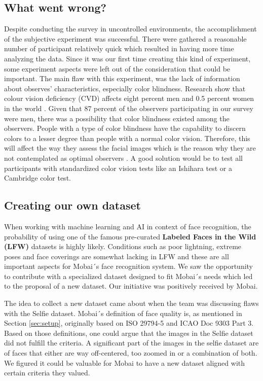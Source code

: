 \subsection{What went wrong?}
Despite conducting the survey in uncontrolled environments, the accomplishment of the subjective experiment was successful. There were gathered a reasonable number of participant relatively quick which resulted in having more time analyzing the data. Since it was our first time creating this kind of experiment, some experiment aspects were left out of the consideration that could be important. The main flaw with this experiment, was the lack of information about observes' characteristics, especially color blindness. Research show that colour vision deficiency (CVD) affects eight percent men and 0.5 percent women in the world \cite{colorblindness}. Given that 87 percent of the observers participating in our survey were men, there was a possibility that color blindness existed among the observers. People with a type of color blindness have the capability to discern colors to a lesser degree than people with a normal color vision. Therefore, this will affect the way they assess the facial images which is the reason why they are not contemplated as optimal observers \cite{Xphdthesis}. A good solution would be to test all participants with standardized color vision tests like an Ishihara test or a Cambridge color test.   

\subsection{Creating our own dataset}
\label{sec:ownData}
When working with machine learning and AI in context of face recognition, the probability of using one of the famous pre-curated \textbf{Labeled Faces in the Wild (LFW)} datasets is highly likely. Conditions such as poor lightning, extreme poses and face coverings are somewhat lacking in LFW and these are all important aspects for Mobai´s face recognition system. We saw the opportunity to contribute with a specialized dataset designed to fit Mobai´s needs which led to the proposal of a new dataset. Our initiative was positively received by Mobai.

The idea to collect a new dataset came about when the team was discussing flaws with the Selfie dataset. Mobai´s definition of face quality is, as mentioned in Section \ref{sec:setup}, originally based on ISO 29794-5 and ICAO Doc 9303 Part 3. Based on those definitions, one could argue that the images in the Selfie dataset did not fulfill the criteria. A significant part of the images in the selfie dataset are of faces that either are way off-centered, too zoomed in or a combination of both. We figured it could be valuable for Mobai to have a new dataset aligned with certain criteria they valued. 

